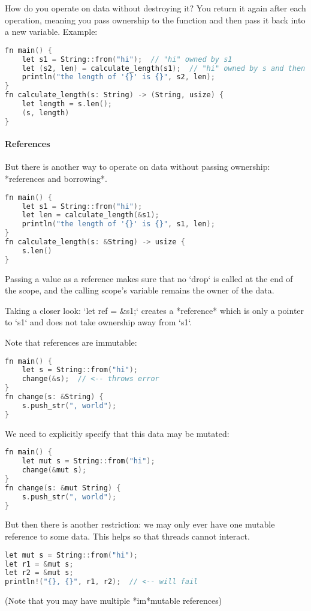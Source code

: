 How do you operate on data without destroying it?
You return it again after each operation, meaning you pass ownership to the function and then pass it back into a new variable.
Example: 

\begin{lstlisting}[language=c]
fn main() {
    let s1 = String::from("hi");  // "hi" owned by s1
    let (s2, len) = calculate_length(s1);  // "hi" owned by s and then s2
    println("the length of '{}' is {}", s2, len);
}
fn calculate_length(s: String) -> (String, usize) {
    let length = s.len();
    (s, length)
}
\end{lstlisting}

\paragraph{References}
But there is another way to operate on data without passing ownership: *references and borrowing*.
\begin{lstlisting}[language=c]
fn main() {
    let s1 = String::from("hi");
    let len = calculate_length(&s1);
    println("the length of '{}' is {}", s1, len);
}
fn calculate_length(s: &String) -> usize {
    s.len()
}
\end{lstlisting}
Passing a value as a reference makes sure that no `drop` is called at the end of the scope, and the calling scope's variable remains the owner of the data.

Taking a closer look:
`let ref = \&s1;` creates a *reference* which is only a pointer to `s1` and does not take ownership away from `s1`.

Note that references are immutable: 
\begin{lstlisting}[language=c]
fn main() {
    let s = String::from("hi");
    change(&s);  // <-- throws error
}
fn change(s: &String) {
    s.push_str(", world");
}
\end{lstlisting}
We need to explicitly specify that this data may be mutated:
\begin{lstlisting}[language=c]
fn main() {
    let mut s = String::from("hi");
    change(&mut s);
}
fn change(s: &mut String) {
    s.push_str(", world");
}
\end{lstlisting}
But then there is another restriction: we may only ever have one mutable reference to some data. This helps so that threads cannot interact.
\begin{lstlisting}[language=c]
let mut s = String::from("hi");
let r1 = &mut s;
let r2 = &mut s;
println!("{}, {}", r1, r2);  // <-- will fail
\end{lstlisting}
(Note that you may have multiple *im*mutable references)

